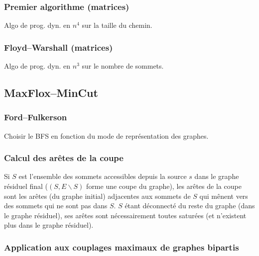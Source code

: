 \documentclass{article}
\begin{document}
\subsubsection{Premier algorithme (matrices)}

Algo de prog. dyn. en $n^4$ sur la taille du chemin.


\subsubsection{Floyd--Warshall (matrices)}

Algo de prog. dyn. en $n^3$ sur le nombre de sommets.



\subsection{MaxFlox--MinCut}

\subsubsection{Ford--Fulkerson}

Choisir le BFS en fonction du mode de représentation des graphes.


\subsubsection{Calcul des arêtes de la coupe}

Si $S$ est l'ensemble des sommets accessibles depuis la source $s$ dans le graphe résiduel final ($(S,E\backslash S)$ forme une coupe du graphe), les arêtes de la coupe sont les arêtes (du graphe initial) adjacentes aux sommets de $S$ qui mênent vers des sommets qui ne sont pas dans $S$. $S$ étant déconnecté du reste du graphe (dans le graphe résiduel), ses arêtes sont nécessairement toutes saturées (et n'existent plus dans le graphe résiduel).

\parbox{0.5\textwidth}{}
\parbox{0.5\textwidth}{}

\subsubsection{Application aux couplages maximaux de graphes bipartis}
\end{document}
